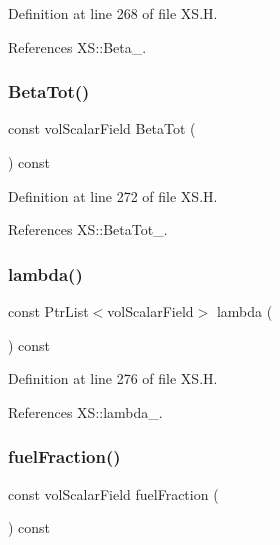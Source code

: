 Definition at line 268 of file X\+S.\+H.



References X\+S\+::\+Beta\+\_\+.

\mbox{\label{classFoam_1_1XS_aa96d596b47a6028287270cfd82bed41f}} 
\subsubsection{\texorpdfstring{Beta\+Tot()}{BetaTot()}}
{\footnotesize\ttfamily const vol\+Scalar\+Field Beta\+Tot (\begin{DoxyParamCaption}{ }\end{DoxyParamCaption}) const\hspace{0.3cm}{\ttfamily [inline]}}



Definition at line 272 of file X\+S.\+H.



References X\+S\+::\+Beta\+Tot\+\_\+.

\mbox{\label{classFoam_1_1XS_a9fe5da186e1af8ac5b1a3adff2686609}} 
\subsubsection{\texorpdfstring{lambda()}{lambda()}}
{\footnotesize\ttfamily const Ptr\+List$<$vol\+Scalar\+Field$>$ lambda (\begin{DoxyParamCaption}{ }\end{DoxyParamCaption}) const\hspace{0.3cm}{\ttfamily [inline]}}



Definition at line 276 of file X\+S.\+H.



References X\+S\+::lambda\+\_\+.

\mbox{\label{classFoam_1_1XS_a3d14d73bfcd0223e7a1c79a407611517}} 
\subsubsection{\texorpdfstring{fuel\+Fraction()}{fuelFraction()}}
{\footnotesize\ttfamily const vol\+Scalar\+Field fuel\+Fraction (\begin{DoxyParamCaption}{ }\end{DoxyParamCaption}) const\hspace{0.3cm}{\ttfamily [inline]}}



